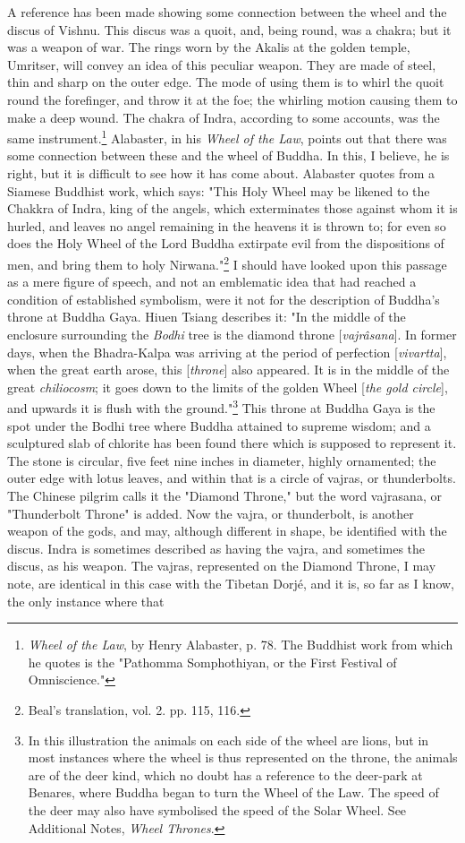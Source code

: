\documentclass[a4paper, 11pt, oneside, polutonikogreek, english]{article}
\begin{document}
A reference has been made showing some connection between the wheel and the discus of Vishnu. This discus was a quoit, and, being round, was a chakra; but it was a weapon of war. The rings worn by the Akalis at the golden temple, Umritser, will convey an idea of this peculiar weapon. They are made of steel, thin and sharp on the outer edge. The mode of using them is to whirl the quoit round the forefinger, and throw it at the foe; the whirling motion causing them to make a deep wound. The chakra of Indra, according to some accounts, was the same instrument.\footnote{\emph{Wheel of the Law}, by Henry Alabaster, p. 78. The Buddhist work from which he quotes is the "Pathomma Somphothiyan, or the First Festival of Omniscience."} Alabaster, in his \emph{Wheel of the Law}, points out that there was some connection between these and the wheel of Buddha. In this, I believe, he is right, but it is difficult to see how it has come about. Alabaster quotes from a Siamese Buddhist work, which says: "This Holy Wheel may be likened to the Chakkra of Indra, king of the angels, which exterminates those against whom it is hurled, and leaves no angel remaining in the heavens it is thrown to; for even so does the Holy Wheel of the Lord Buddha extirpate evil from the dispositions of men, and bring them to holy Nirwana."\footnote{Beal's translation, vol. 2. pp. 115, 116.} I should have looked upon this passage as a mere figure of speech, and not an emblematic idea that had reached a condition of established symbolism, were it not for the description of Buddha's throne at Buddha Gaya. Hiuen Tsiang describes it: "In the middle of the enclosure surrounding the \emph{Bodhi} tree is the diamond throne [\emph{vajrâsana}]. In former days, when the Bhadra-Kalpa was arriving at the period of perfection [\emph{vivartta}], when the great earth arose, this [\emph{throne}] also appeared. It is in the middle of the great \emph{chiliocosm}; it goes down to the limits of the golden Wheel [\emph{the gold circle}], and upwards it is flush with the ground."\footnote{In this illustration the animals on each side of the wheel are lions, but in most instances where the wheel is thus represented on the throne, the animals are of the deer kind, which no doubt has a reference to the deer-park at Benares, where Buddha began to turn the Wheel of the Law. The speed of the deer may also have symbolised the speed of the Solar Wheel. See Additional Notes, \emph{Wheel Thrones}.} This throne at Buddha Gaya is the spot under the Bodhi tree where Buddha attained to supreme wisdom; and a sculptured slab of chlorite has been found there which is supposed to represent it. The stone is circular, five feet nine inches in diameter, highly ornamented; the outer edge with lotus leaves, and within that is a circle of vajras, or thunderbolts. The Chinese pilgrim calls it the "Diamond Throne," but the word vajrasana, or "Thunderbolt Throne" is added. Now the vajra, or thunderbolt, is another weapon of the gods, and may, although different in shape, be identified with the discus. Indra is sometimes described as having the vajra, and sometimes the discus, as his weapon. The vajras, represented on the Diamond Throne, I may note, are identical in this case with the Tibetan Dorjé, and it is, so far as I know, the only instance where that 
\end{document}

